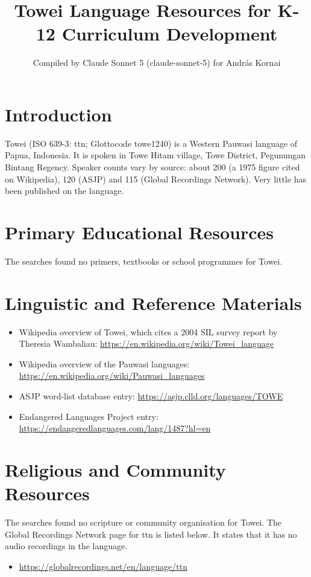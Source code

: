 \documentclass[12pt]{article}
\title{Towei Language Resources for K-12 Curriculum Development}
\author{Compiled by Claude Sonnet 5 (claude-sonnet-5) for Andr\'as Kornai}
\date{}
\begin{document}
\maketitle

\section{Introduction}
Towei (ISO 639-3: ttn; Glottocode towe1240) is a Western Pauwasi language of Papua, Indonesia. It is spoken in Towe Hitam village, Towe District, Pegunungan Bintang Regency. Speaker counts vary by source: about 200 (a 1975 figure cited on Wikipedia), 120 (ASJP) and 115 (Global Recordings Network). Very little has been published on the language.

\section{Primary Educational Resources}
The searches found no primers, textbooks or school programmes for Towei.

\section{Linguistic and Reference Materials}
\begin{itemize}
\item Wikipedia overview of Towei, which cites a 2004 SIL survey report by Theresia Wambaliau: \url{https://en.wikipedia.org/wiki/Towei_language}
\item Wikipedia overview of the Pauwasi languages: \url{https://en.wikipedia.org/wiki/Pauwasi_languages}
\item ASJP word-list database entry: \url{https://asjp.clld.org/languages/TOWE}
\item Endangered Languages Project entry: \url{https://endangeredlanguages.com/lang/1487?hl=en}
\end{itemize}

\section{Religious and Community Resources}
The searches found no scripture or community organisation for Towei. The Global Recordings Network page for ttn is listed below. It states that it has no audio recordings in the language.
\begin{itemize}
\item \url{https://globalrecordings.net/en/language/ttn}
\end{itemize}
\end{document}
